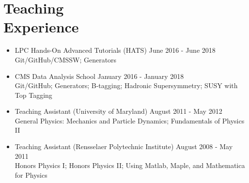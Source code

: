 \section{Teaching\\Experience}
\begin{itemize}[leftmargin=12pt]
\item LPC Hands-On Advanced Tutorials (HATS) \hfill June 2016 - June 2018\\
Git/GitHub/CMSSW; Generators
\item CMS Data Analysis School \hfill January 2016 - January 2018\\
Git/GitHub; Generators; B-tagging; Hadronic Supersymmetry; SUSY with Top Tagging
\item Teaching Assistant (University of Maryland) \hfill August 2011 - May 2012\\
General Physics: Mechanics and Particle Dynamics; Fundamentals of Physics II
\item Teaching Assistant (Rensselaer Polytechnic Institute) \hfill August 2008 - May 2011\\
Honors Physics I; Honors Physics II; Using Matlab, Maple, and Mathematica for Physics
\end{itemize}